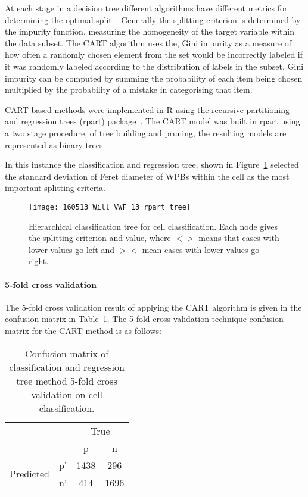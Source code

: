 At each stage in a decision tree different algorithms have different metrics for determining the optimal split~\cite{Rokach2005}. Generally the splitting criterion is determined by the impurity function, measuring the homogeneity of the target variable within the data subset. The CART algorithm uses the, Gini impurity as a measure of how often a randomly chosen element from the set would be incorrectly labeled if it was randomly labeled according to the distribution of labels in the subset. Gini impurity can be computed by summing the probability of each item being chosen multiplied by the probability of a mistake in categorising that item.

CART based methods were implemented in R using the recursive partitioning and regression trees (rpart) package~\cite{Therneau2015}. The CART model was built in rpart using a two stage procedure, of tree building and pruning, the resulting models are represented as binary trees~\cite{Duda2000}.

In this instance the classification and regression tree, shown in Figure~\ref{figure:endothelial_morphometry:cell_classification:CART_tree} selected the standard deviation of Feret diameter of WPBs within the cell as the most important splitting criteria.

\begin{figure}[htbp!]
	\centering
	\texttt{[image: 160513\_Will\_VWF\_13\_rpart\_tree]}
	\caption[CART hierarchical tree]{Hierarchical classification tree for cell classification. Each node gives the splitting criterion and value, where $<>$ means that cases with lower values go left and $><$ mean cases with lower values go right.}
	\label{figure:endothelial_morphometry:cell_classification:CART_tree}
\end{figure}

\paragraph{5-fold cross validation}
The 5-fold cross validation result of applying the CART algorithm is given in the confusion matrix in Table~\ref{table:endothelial_morphometry:cart_confusion_matrix}.
The 5-fold cross validation technique confusion matrix for the CART method is as follows:

\begin{table}[htbp]
\caption[Confusion matrix of CART cross validation on cell classification]{Confusion matrix of classification and regression tree method 5-fold cross validation on cell classification.}
\label{table:endothelial_morphometry:cart_confusion_matrix}
\centering
\begin{tabular}{cc|cc}
	\multicolumn{2}{c}{}&\multicolumn{2}{c}{True}\\
	\multicolumn{2}{c|}{}& p & n\\
	\cline{2-4}
	\multirow{2}{*}{Predicted}& p' & 1438 & 296\\ & n' & 414 & 1696\\
\end{tabular}
\end{table}

